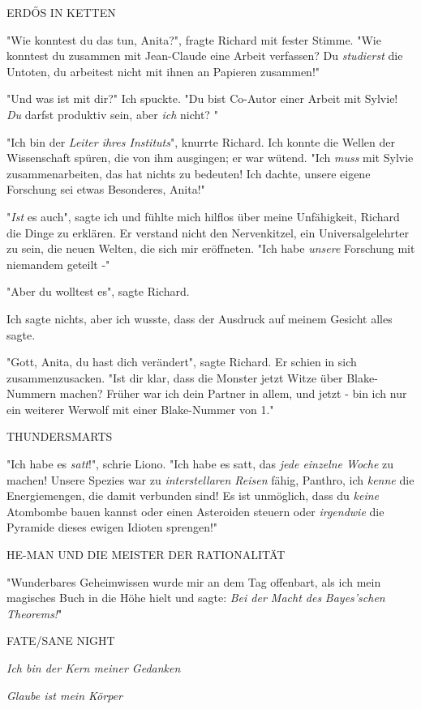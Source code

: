 {ERDŐS IN KETTEN

"Wie konntest du das tun, Anita?", fragte Richard mit fester Stimme. "Wie konntest du zusammen mit Jean-Claude eine Arbeit verfassen? Du \emph{studierst} die Untoten, du arbeitest nicht mit ihnen an Papieren zusammen!"

"Und was ist mit dir?" Ich spuckte. "Du bist Co-Autor einer Arbeit mit Sylvie! \emph{Du} darfst produktiv sein, aber \emph{ich} nicht? "

"Ich bin der \emph{Leiter ihres Instituts}", knurrte Richard. Ich konnte die Wellen der Wissenschaft spüren, die von ihm ausgingen; er war wütend. "Ich \emph{muss} mit Sylvie zusammenarbeiten, das hat nichts zu bedeuten! Ich dachte, unsere eigene Forschung sei etwas Besonderes, Anita!"

"\emph{Ist} es auch", sagte ich und fühlte mich hilflos über meine Unfähigkeit, Richard die Dinge zu erklären. Er verstand nicht den Nervenkitzel, ein Universalgelehrter zu sein, die neuen Welten, die sich mir eröffneten. "Ich habe \emph{unsere} Forschung mit niemandem geteilt -"

"Aber du wolltest es", sagte Richard.

Ich sagte nichts, aber ich wusste, dass der Ausdruck auf meinem Gesicht alles sagte.

"Gott, Anita, du hast dich verändert", sagte Richard. Er schien in sich zusammenzusacken. "Ist dir klar, dass die Monster jetzt Witze über Blake-Nummern machen? Früher war ich dein Partner in allem, und jetzt - bin ich nur ein weiterer Werwolf mit einer Blake-Nummer von 1."

THUNDERSMARTS

"Ich habe es \emph{satt}!", schrie Liono. "Ich habe es satt, das \emph{jede einzelne Woche} zu machen! Unsere Spezies war zu \emph{interstellaren Reisen} fähig, Panthro, ich \emph{kenne} die Energiemengen, die damit verbunden sind! Es ist unmöglich, dass du \emph{keine} Atombombe bauen kannst oder einen Asteroiden steuern oder \emph{irgendwie} die Pyramide dieses ewigen Idioten sprengen!"

HE-MAN UND DIE MEISTER DER RATIONALITÄT

"Wunderbares Geheimwissen wurde mir an dem Tag offenbart, als ich mein magisches Buch in die Höhe hielt und sagte: \emph{Bei der Macht des} \emph{Bayes'schen} \emph{Theorems!}"

FATE/SANE NIGHT

\emph{\emph{Ich bin der Kern meiner Gedanken}}

\emph{\emph{Glaube ist mein Körper}}

}
